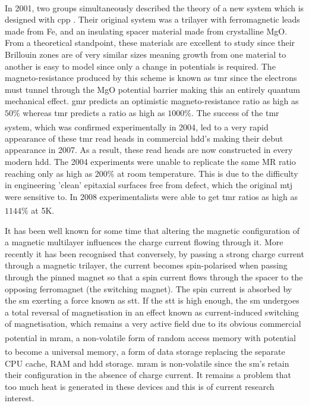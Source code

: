 \documentclass[a4paper, 12pt]{article}
\newcommand{\site}[1]{\textsuperscript{\textcolor{blue}{\cite{#1}}}}
\begin{document}
	\par In 2001, two groups simultaneously described the theory of a new system\textsuperscript{\textcolor{blue}{\cite{tunnel1,tunnel2}}} which is designed with \gls{cpp} . Their original system was a trilayer with ferromagnetic leads made from Fe, and an insulating spacer material made from crystalline MgO. From a theoretical standpoint, these materials are excellent to study since their Brillouin zones are of very similar sizes meaning growth from one material to another is easy to model since only a change in potentials is required. The magneto-resistance produced by this scheme is known as \gls{tmr} since the electrons must tunnel through the MgO potential barrier making this an entirely quantum mechanical effect. \gls{gmr} predicts an optimistic magneto-resistance ratio as high as $50\%$ whereas \gls{tmr} predicts a ratio as high as $1000\%$.
	The success of the \gls{tmr} system, which was confirmed experimentally in 2004\textsuperscript{\textcolor{blue}{\cite{2004,2004P}}}, led to a very rapid appearance of these \gls{tmr} read heads in commercial \gls{hdd}'s making their debut appearance in 2007. As a result, these read heads are now constructed in every modern \gls{hdd}. The 2004 experiments were unable to replicate the same MR ratio reaching only as high as $200\%$ at room temperature. This is due to the difficulty in engineering 'clean' epitaxial surfaces free from defect, which the original \gls{mtj} were sensitive to. In 2008 experimentalists were able to get \gls{tmr} ratios as high as $1144\%$ at 5K\textsuperscript{\textcolor{blue}{\cite{1100}}}.
	\par It	has been well known for some time that altering the magnetic configuration of a magnetic multilayer influences the charge current flowing through it. More recently it has been recognised that conversely, by passing a strong charge current through a magnetic trilayer, the current becomes spin-polarised when passing through the pinned magnet so that a spin current flows through the spacer to the opposing ferromagnet (the switching magnet). The spin current is absorbed by the \gls{sm} exerting a force known as \gls{stt}. If the \gls{stt} is high enough, the \gls{sm} undergoes a total reversal of magnetisation in an effect known as current-induced switching of magnetisation, which remains a very active field due to its obvious commercial potential in \gls{mram}\textsuperscript{\textcolor{blue}{\cite{stt}}}, a non-volatile form of random access memory with potential to become a universal memory\site{universal}, a form of data storage replacing the separate CPU cache, RAM and \gls{hdd} storage. \gls{mram} is non-volatile since the \gls{sm}'s retain their configuration in the absence of charge current. It remains a problem that too much heat is generated in these devices and this is of current research interest.
\end{document}
